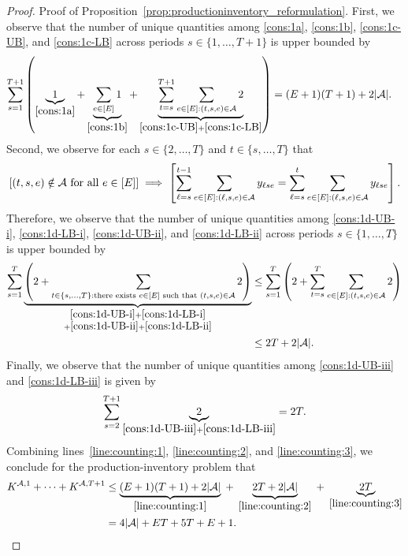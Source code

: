 \documentclass[nonblindrev,mnsc]{informs3} %
\begin{document}
\begin{APPENDICES}
\begin{proof}{Proof of Proposition~\ref{prop:productioninventory_reformulation}.}
First, we observe that the number of unique quantities among \eqref{cons:1a}, \eqref{cons:1b}, \eqref{cons:1c-UB}, and \eqref{cons:1c-LB} across periods $s \in \{1,\ldots,T+1\}$ is upper bounded by 
\begin{align}
\sum_{s=1}^{T+1} \left(  \underbrace{1}_{\eqref{cons:1a}} +  \underbrace{\sum_{e \in [E]} 1}_{\eqref{cons:1b}} + \underbrace{  \sum_{t=s}^{T+1} \sum_{e \in [E]: (t,s,e) \in \mathcal{A} }2 }_{\eqref{cons:1c-UB} + \eqref{cons:1c-LB}} \right) &= (E+1) (T+1) + 2 | \mathcal{A}|. \label{line:counting:1}
\end{align}
Second, we observe for each $s \in \{2,\ldots,T\}$ and $t \in \{s,\ldots,T\}$ that \begin{align*}
\left[ (t,s,e) \notin \mathcal{A} \textnormal{ for all } e \in [E]\right] \implies  \left[ \sum_{\ell=s}^{t-1} \sum_{e \in [E]: (\ell,s,e) \in \mathcal{A}} y_{\ell se}  =  \sum_{\ell=s}^{t} \sum_{e \in [E]: (\ell,s,e) \in \mathcal{A}} y_{\ell se}  \right].
\end{align*}
Therefore, we observe that the number of unique quantities among \eqref{cons:1d-UB-i}, \eqref{cons:1d-LB-i}, \eqref{cons:1d-UB-ii}, and \eqref{cons:1d-LB-ii} across periods  $s \in \{1,\ldots,T\}$ is upper bounded by
\begin{align}
   \sum_{s=1}^T \underbrace{\left(2 + \sum_{t \in \{s,\ldots,T\}: \textnormal{there exists } e \in [E] \textnormal{ such that } (t,s,e) \in \mathcal{A}} 2 \right)}_{\substack{\eqref{cons:1d-UB-i} + \eqref{cons:1d-LB-i} \\+ \eqref{cons:1d-UB-ii} +\eqref{cons:1d-LB-ii}}} &\le     \sum_{s=1}^T \left(2 + \sum_{t =s}^T \sum_{e \in [E]: (t,s,e) \in \mathcal{A}} 2 \right) \notag \\
    &\le 2T + 2 | \mathcal{A}|. \label{line:counting:2}
\end{align}
Finally, we observe that the number of unique quantities among  \eqref{cons:1d-UB-iii} and \eqref{cons:1d-LB-iii} is given by 
\begin{align}
\sum_{s=2}^{T+1}  \underbrace{  2 }_{\eqref{cons:1d-UB-iii} + \eqref{cons:1d-LB-iii}}  =  2T.  \label{line:counting:3}
\end{align}
Combining lines~\eqref{line:counting:1}, \eqref{line:counting:2}, and \eqref{line:counting:3}, we conclude for the production-inventory problem that 
\begin{align*}
K^{\mathcal{A},1} + \cdots + K^{\mathcal{A},T+1} &\le \underbrace{(E+1)(T+1) + 2 | \mathcal{A}|}_{\eqref{line:counting:1}} \;+\; \underbrace{ 2T + 2 | \mathcal{A}| }_{\eqref{line:counting:2}}\; + \; \underbrace{2T}_{\eqref{line:counting:3}} \\
&= 4 | \mathcal{A}| + ET + 5T + E + 1. 
\end{align*}


\end{proof}
\end{APPENDICES}
\end{document}
